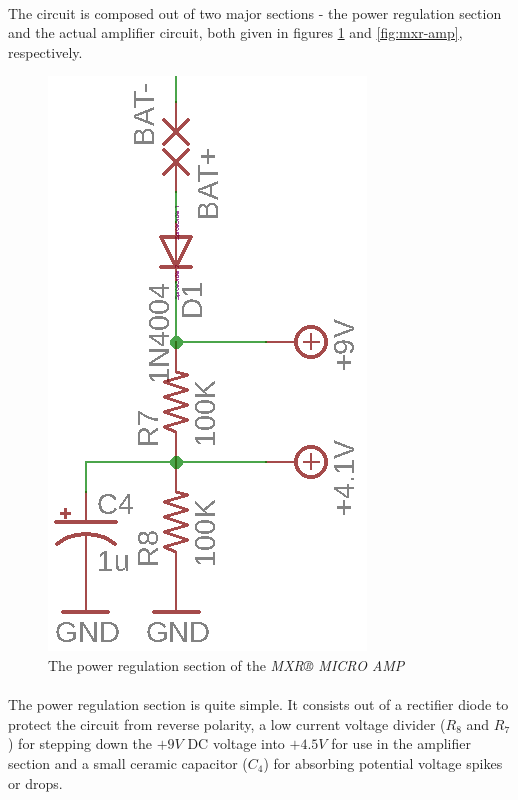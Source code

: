 \documentclass[a4paper, 12pt]{article}
\begin{document}
\paragraph*{}
The circuit is composed out of two major sections - the power regulation 
section and the actual amplifier circuit, both given in figures 
\ref{fig:mxr-power} and \ref{fig:mxr-amp}, respectively.

\begin{figure}[ht]
	\centering
	\includegraphics{img/mxr-power}
	\caption{The power regulation section of the \textit{MXR® MICRO AMP}}
	\label{fig:mxr-power}
\end{figure}

\paragraph*{}
The power regulation section is quite simple. It consists out of a rectifier 
diode to protect the circuit from reverse polarity, a low current voltage 
divider ($R_8$ and $R_7$) for stepping down the $+9\si{V}$ DC voltage into 
$+4.5\si{V}$ for use in the amplifier section and a small ceramic capacitor 
($C_4$) for absorbing potential voltage spikes or drops.
\end{document}
